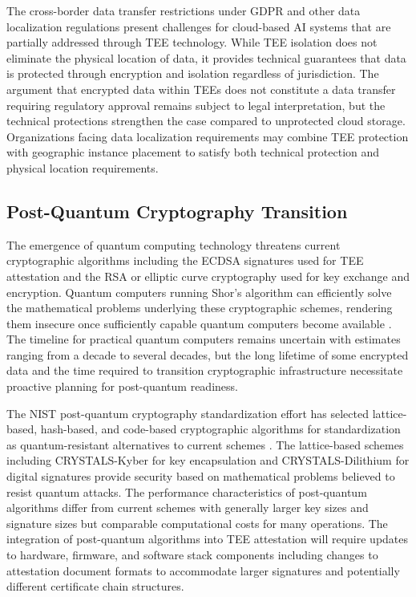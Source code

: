 The cross-border data transfer restrictions under GDPR and other data localization regulations present challenges for cloud-based AI systems that are partially addressed through TEE technology. While TEE isolation does not eliminate the physical location of data, it provides technical guarantees that data is protected through encryption and isolation regardless of jurisdiction. The argument that encrypted data within TEEs does not constitute a data transfer requiring regulatory approval remains subject to legal interpretation, but the technical protections strengthen the case compared to unprotected cloud storage. Organizations facing data localization requirements may combine TEE protection with geographic instance placement to satisfy both technical protection and physical location requirements.

\subsection{Post-Quantum Cryptography Transition}

The emergence of quantum computing technology threatens current cryptographic algorithms including the ECDSA signatures used for TEE attestation and the RSA or elliptic curve cryptography used for key exchange and encryption. Quantum computers running Shor's algorithm can efficiently solve the mathematical problems underlying these cryptographic schemes, rendering them insecure once sufficiently capable quantum computers become available \cite{post_quantum_nist}. The timeline for practical quantum computers remains uncertain with estimates ranging from a decade to several decades, but the long lifetime of some encrypted data and the time required to transition cryptographic infrastructure necessitate proactive planning for post-quantum readiness.

The NIST post-quantum cryptography standardization effort has selected lattice-based, hash-based, and code-based cryptographic algorithms for standardization as quantum-resistant alternatives to current schemes \cite{post_quantum_nist, lattice_crypto}. The lattice-based schemes including CRYSTALS-Kyber for key encapsulation and CRYSTALS-Dilithium for digital signatures provide security based on mathematical problems believed to resist quantum attacks. The performance characteristics of post-quantum algorithms differ from current schemes with generally larger key sizes and signature sizes but comparable computational costs for many operations. The integration of post-quantum algorithms into TEE attestation will require updates to hardware, firmware, and software stack components including changes to attestation document formats to accommodate larger signatures and potentially different certificate chain structures.

